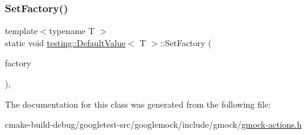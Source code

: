 \mbox{\label{classtesting_1_1DefaultValue_af012445ff5b194940c1427529707cb91}} 
\subsubsection{\texorpdfstring{SetFactory()}{SetFactory()}}
{\footnotesize\ttfamily template$<$typename T $>$ \\
static void \mbox{\hyperlink{classtesting_1_1DefaultValue}{testing\+::\+Default\+Value}}$<$ T $>$\+::Set\+Factory (\begin{DoxyParamCaption}\item[{\mbox{\hyperlink{classtesting_1_1DefaultValue_a5763a68d75e0a4c97fcaff708e2df803}{Factory\+Function}}}]{factory }\end{DoxyParamCaption})\hspace{0.3cm}{\ttfamily [inline]}, {\ttfamily [static]}}



The documentation for this class was generated from the following file\+:\begin{DoxyCompactItemize}
\item 
cmake-\/build-\/debug/googletest-\/src/googlemock/include/gmock/\mbox{\hyperlink{gmock-actions_8h}{gmock-\/actions.\+h}}\end{DoxyCompactItemize}
